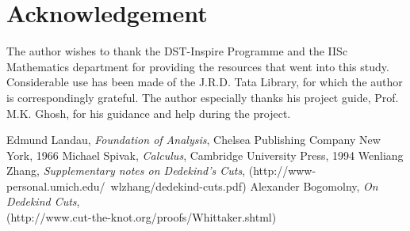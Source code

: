 \documentclass[12pt,a4paper,final,titlepage]{article}
\begin{document}
\newpage
\section{Acknowledgement}
The author wishes to thank the DST-Inspire Programme and the IISc Mathematics department for providing the resources that went into this study. Considerable use has been made of the J.R.D. Tata Library, for which the author is correspondingly grateful. The author especially thanks his project guide, Prof. M.K. Ghosh, for his guidance and help during the project.

\newpage
\begin{thebibliography}{100}
 Edmund Landau, \textit{Foundation of Analysis}, Chelsea Publishing Company New York, 1966
 Michael Spivak, \textit{Calculus}, Cambridge University Press, 1994
 Wenliang Zhang, \textit{Supplementary notes on Dedekind's Cuts}, (http://www-personal.umich.edu/~wlzhang/dedekind-cuts.pdf)
 Alexander Bogomolny, \textit{On Dedekind Cuts},\\ (http://www.cut-the-knot.org/proofs/Whittaker.shtml)
\end{thebibliography}
\end{document}
